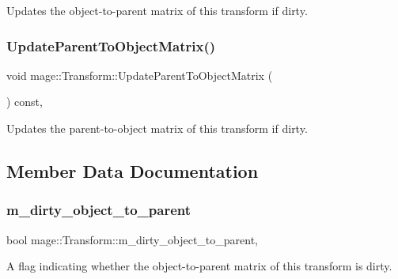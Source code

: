 Updates the object-\/to-\/parent matrix of this transform if dirty. \hypertarget{classmage_1_1_transform_a55829fd7bc87753f6a1c6facfc12ca80}{}\label{classmage_1_1_transform_a55829fd7bc87753f6a1c6facfc12ca80} 
\subsubsection{\texorpdfstring{Update\+Parent\+To\+Object\+Matrix()}{UpdateParentToObjectMatrix()}}
{\footnotesize\ttfamily void mage\+::\+Transform\+::\+Update\+Parent\+To\+Object\+Matrix (\begin{DoxyParamCaption}{ }\end{DoxyParamCaption}) const\hspace{0.3cm}{\ttfamily [private]}, {\ttfamily [noexcept]}}

Updates the parent-\/to-\/object matrix of this transform if dirty. 

\subsection{Member Data Documentation}
\hypertarget{classmage_1_1_transform_a0b6df5bbb04bb38efb3123b4749afc98}{}\label{classmage_1_1_transform_a0b6df5bbb04bb38efb3123b4749afc98} 
\subsubsection{\texorpdfstring{m\+\_\+dirty\+\_\+object\+\_\+to\+\_\+parent}{m\_dirty\_object\_to\_parent}}
{\footnotesize\ttfamily bool mage\+::\+Transform\+::m\+\_\+dirty\+\_\+object\+\_\+to\+\_\+parent\hspace{0.3cm}{\ttfamily [mutable]}, {\ttfamily [private]}}

A flag indicating whether the object-\/to-\/parent matrix of this transform is dirty. \hypertarget{classmage_1_1_transform_a3d415d6a36e2307538c2da461e517a6d}{}\label{classmage_1_1_transform_a3d415d6a36e2307538c2da461e517a6d} 
